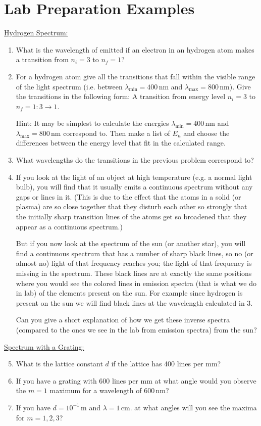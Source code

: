 \newpage
\section{Lab Preparation Examples}
\underline{Hydrogen Spectrum:}
\begin{enumerate}
\item What is the wavelength of emitted if an electron in an hydrogen atom makes a transition from $n_i=3$ to $n_f=1$?

\item For a hydrogen atom give all the transitions that fall within the visible range of the light spectrum (i.e. between $\lambda_{\mathrm{min}}=400\,\mathrm{nm}$ and $\lambda_{\mathrm{max}}=800\,\mathrm{nm}$). Give the transitions in the following form:
A transition from energy level $n_i=3$ to $n_f=1:3 \rightarrow 1$.\myskip

Hint: It may be simplest to calculate the energies $\lambda_{\mathrm{min}}=400\,\mathrm{nm}$ and $\lambda_{\mathrm{max}}=800\,\mathrm{nm}$ correspond to. Then make a list of $E_{n}$ and choose the differences between the energy
level that fit in the calculated range.

\item What wavelengths do the transitions in the previous problem correspond to?
\item If you look at the light of an object at high temperature (e.g. a normal light bulb), you will find that it usually emits a continuous spectrum without any gaps or lines in it. (This is due to the effect that the atoms in a solid (or plasma) are so close together that they disturb each other so strongly that the initially sharp transition lines of the atoms get so broadened that they appear as a continuous spectrum.)\myskip

But if you now look at the spectrum of the sun (or another star), you will find a continuous spectrum that has a number of sharp black lines, so no (or almost no) light of that frequency reaches you; the light of that frequency is missing in the spectrum. These black lines are at exactly the same positions where you would see the colored lines in emission spectra (that is what we do in lab) of the elements present on the sun. For example since hydrogen is present on the sun we will find black lines at the
wavelength calculated in 3.\myskip

Can you give a short explanation of how we get these inverse spectra (compared to the ones we see in the lab from emission spectra) from the sun? 
\end{enumerate}

\noindent\underline{Spectrum with a Grating:}
\begin{enumerate}\setcounter{enumi}{4}
\item What is the lattice constant $d$ if the lattice has 400 lines per mm?
\item If you have a grating with 600 lines per mm at what angle would you observe the $m=1$ maximum for a wavelength of $600\,\mathrm{nm}$?
\item If you have $d = 10^{-1}\, \mathrm{m}$ and $\lambda = 1\,\mathrm{cm}$. at what angles will you see the maxima for $m=1, 2, 3$?
\end{enumerate}
